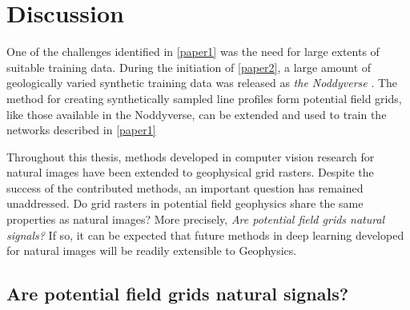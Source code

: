 \documentclass[manuscript.tex]{subfiles}
\begin{document}
\section{Discussion} %


One of the challenges identified in \cref{paper1} was the need for large extents of suitable training data.
During the initiation of \cref{paper2}, a large amount of geologically varied synthetic training data was released as \emph{the Noddyverse} \parencite{jessellNoddyverseMassiveData2022}.
The method for creating synthetically sampled line profiles form potential field grids, like those available in the Noddyverse, can be extended and used to train the networks described in \cref{paper1}



Throughout this thesis, methods developed in computer vision research for natural images have been extended to geophysical grid rasters.
Despite the success of the contributed methods, an important question has remained unaddressed.
Do grid rasters in potential field geophysics share the same properties as natural images?
More precisely, \emph{Are potential field grids natural signals?}
If so, it can be expected that future methods in deep learning developed for natural images will be readily extensible to Geophysics.
\Textcite{donohoCompressedSensing2006}

\subsection{Are potential field grids natural signals?}
\end{document}
